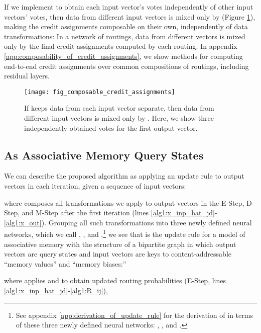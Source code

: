 \documentclass[11pt,a4paper]{article}
\begin{document}
If we implement  to obtain each input vector's votes independently of other input vectors' votes, then data from different input vectors is mixed only by  (Figure \ref{fig:composable_credit_assignments}), making the credit assignments composable on their own, independently of data transformations: In a network of routings, data from different vectors is mixed only by the final credit assignments computed by each routing. In appendix \ref{app:composability_of_credit_assignments}, we show methods for computing end-to-end credit assignments over common compositions of routings, including residual layers.

\begin{figure}[t]
	\vskip 0.1in
	\begin{center}
		\centerline{\texttt{[image: fig\_composable\_credit\_assignments]}}
		\caption{If  keeps data from each input vector separate, then data from different input vectors is mixed only by . Here, we show three independently obtained votes for the first output vector.}
		\label{fig:composable_credit_assignments}
	\end{center}
	\vskip -0.2in
\end{figure} 




\subsection{As Associative Memory Query States}\label{ssec:as_associative_memory_states}

We can describe the proposed algorithm as applying an update rule  to output vectors in each iteration, given a sequence of input vectors:



where  composes all transformations we apply to output vectors in the E-Step, D-Step, and M-Step after the first iteration (lines \ref{alg1:x_inp_hat_jd}-\ref{alg1:x_out}). Grouping all such transformations into three newly defined neural networks, which we call , , and ,\footnote{See appendix \ref{app:derivation_of_update_rule} for the derivation of  in terms of these three newly defined neural networks: , , and .} we see that  is the update rule for a model of associative memory with the structure of a bipartite graph in which output vectors are query states and input vectors are keys to content-addressable ``memory values'' and ``memory biases:''



where  applies  and  to obtain updated routing probabilities  (E-Step, lines \ref{alg1:x_inp_hat_jd}-\ref{alg1:R_ij}),
\end{document}
